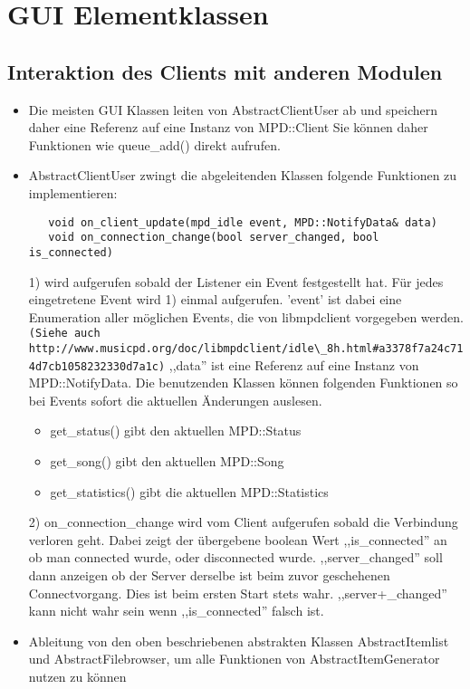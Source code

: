 \section{GUI Elementklassen}
\subsection{Interaktion des Clients mit anderen Modulen}
\begin{itemize}
\item Die meisten GUI Klassen leiten von AbstractClientUser ab und speichern daher eine Referenz auf eine Instanz von MPD::Client
        Sie können daher Funktionen wie queue\_add() direkt aufrufen.
\item AbstractClientUser zwingt die abgeleitenden Klassen folgende Funktionen zu implementieren: 
\begin{verbatim} 
   void on_client_update(mpd_idle event, MPD::NotifyData& data)
   void on_connection_change(bool server_changed, bool is_connected)
\end{verbatim}

1) wird aufgerufen sobald der Listener ein Event festgestellt hat. Für jedes eingetretene Event wird 1)
   einmal aufgerufen. 'event' ist dabei eine Enumeration aller möglichen Events, die von libmpdclient 
   vorgegeben werden. \verb+(Siehe auch http://www.musicpd.org/doc/libmpdclient/idle\_8h.html#a3378f7a24c714d7cb1058232330d7a1c)+
   ,,data'' ist eine Referenz auf eine Instanz von MPD::NotifyData. Die benutzenden Klassen können folgenden Funktionen so
   bei Events sofort die aktuellen Änderungen auslesen. 
   \begin{itemize} 
     \item get\_status() gibt den aktuellen MPD::Status
     \item get\_song() gibt den aktuellen MPD::Song
     \item get\_statistics() gibt die aktuellen MPD::Statistics
   \end{itemize} 

2) on\_connection\_change wird vom Client aufgerufen sobald die Verbindung verloren geht.
   Dabei zeigt der übergebene boolean Wert ,,is\_connected'' an ob man connected wurde, oder disconnected wurde.
   ,,server\_changed'' soll dann anzeigen ob der Server derselbe ist beim zuvor geschehenen Connectvorgang.
   Dies ist beim ersten Start stets wahr. ,,server+\_changed'' kann nicht wahr sein wenn ,,is\_connected'' falsch ist.
\item Ableitung von den oben beschriebenen abstrakten Klassen AbstractItemlist und AbstractFilebrowser, um alle Funktionen von AbstractItemGenerator nutzen zu können  
\end{itemize}


